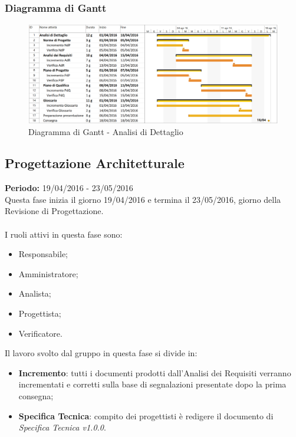 \subsubsection{Diagramma di Gantt}
\begin{figure}[H]
	\centering
	\includegraphics[width= 16cm]{immagini/ad_gantt.png}
	\caption{Diagramma di Gantt - Analisi di Dettaglio}
\end{figure}
\newpage

\subsection{Progettazione Architetturale}
\textbf{Periodo:} 19/04/2016 - 23/05/2016\\
Questa fase inizia il giorno 19/04/2016 e termina il 23/05/2016, giorno della 
Revisione di Progettazione. \\\\
I ruoli attivi in questa fase sono:

\begin{itemize}
	\item Responsabile;
	\item Amministratore;
	\item Analista;
	\item Progettista;
	\item Verificatore.
\end{itemize}
Il lavoro svolto dal gruppo in questa fase si divide in:
\begin{itemize}
	\item \textbf{Incremento}: tutti i documenti prodotti dall'Analisi dei 
	Requisiti verranno incrementati e corretti sulla base di segnalazioni 
	presentate dopo la prima consegna;
	\item \textbf{Specifica Tecnica}: compito dei progettisti è redigere il 
	documento di \textit{Specifica Tecnica v1.0.0}.
\end{itemize}

